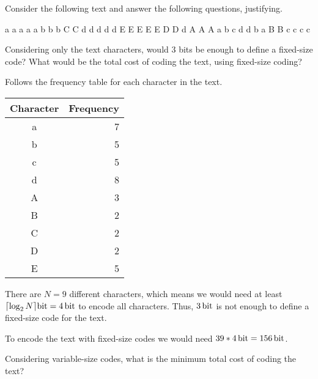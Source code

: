 \documentclass{cal}
\begin{document}
{
Consider the following text and answer the following questions, justifying.

\begin{center}
    a a a a a b b b C C d d d d d E E E E E D D d A A A a b c d d b a B B c c c c
\end{center}

Considering only the text characters, would 3 bits be enough to define a fixed-size code? What would be the total cost of coding the text, using fixed-size coding?

\ansseparator

Follows the frequency table for each character in the text.
\begin{center} \begin{tabular}{c | r}
    \textbf{Character} & \textbf{Frequency} \\ \hline
    a                  &                  7 \\
    b                  &                  5 \\
    c                  &                  5 \\
    d                  &                  8 \\
    A                  &                  3 \\
    B                  &                  2 \\
    C                  &                  2 \\
    D                  &                  2 \\
    E                  &                  5 \\
\end{tabular} \end{center}

There are $N=9$ different characters, which means we would need at least $\lceil \log_2{N} \rceil \SI{}{\bit} = \SI{4}{\bit}$ to encode all characters. Thus, $\SI{3}{\bit}$ is not enough to define a fixed-size code for the text.

To encode the text with fixed-size codes we would need $39 * \SI{4}{\bit} = \SI{156}{\bit}$.

Considering variable-size codes, what is the minimum total cost of coding the text?

\ansseparator

}
\end{document}
